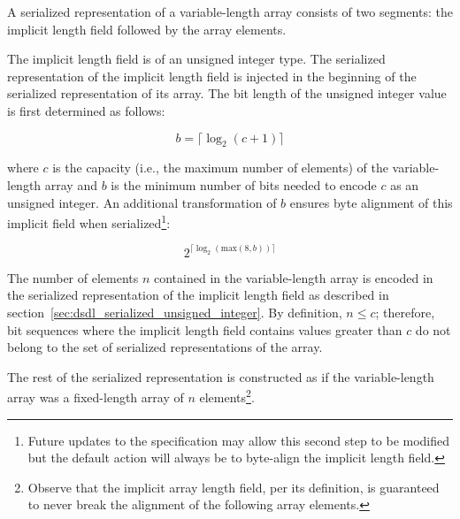 A serialized representation of a variable-length array consists of two segments:
the implicit length field followed by the array elements.

The implicit length field is of an unsigned integer type.
The serialized representation of the implicit length field
is injected in the beginning of the serialized representation of its array.
The bit length of the unsigned integer value is first determined as follows:

$$b=\lceil{}\log_2 (c + 1)\rceil{}$$

where $c$ is the capacity (i.e., the maximum number of elements) of the variable-length array and
$b$ is the minimum number of bits needed to encode $c$ as an unsigned integer. An additional transformation
of $b$ ensures byte alignment of this implicit field when serialized\footnote{Future updates to the specification
may allow this second step to be modified but the default action will always be to byte-align the implicit
length field.}:

$$2^{\lceil{}\log_2 (\text{max}(8, b))\rceil{}}$$

The number of elements $n$ contained in the variable-length array is encoded
in the serialized representation of the implicit length field
as described in section~\ref{sec:dsdl_serialized_unsigned_integer}.
By definition, $n \leq c$; therefore, bit sequences where the implicit length field contains values
greater than $c$ do not belong to the set of serialized representations of the array.

The rest of the serialized representation is constructed as if the variable-length array was
a fixed-length array of $n$ elements\footnote{%
    Observe that the implicit array length field, per its definition,
    is guaranteed to never break the alignment of the following array elements.
}.

